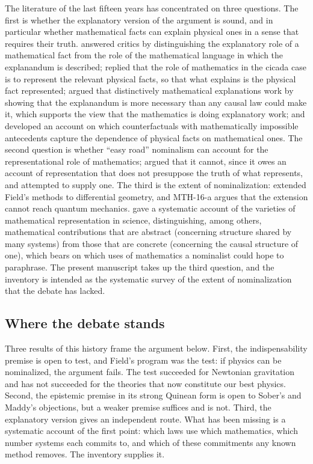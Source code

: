 \documentclass{situationist-preprint}
\begin{document}
The literature of the last fifteen years has concentrated on three questions. The first is whether the explanatory version of the argument is sound, and in particular whether mathematical facts can explain physical ones in a sense that requires their truth. \citet{Baker2009} answered critics by distinguishing the explanatory role of a mathematical fact from the role of the mathematical language in which the explanandum is described; \citet{Saatsi2011} replied that the role of mathematics in the cicada case is to represent the relevant physical facts, so that what explains is the physical fact represented; \citet{Lange2013} argued that distinctively mathematical explanations work by showing that the explanandum is more necessary than any causal law could make it, which supports the view that the mathematics is doing explanatory work; and \citet{Baron2017} developed an account on which counterfactuals with mathematically impossible antecedents capture the dependence of physical facts on mathematical ones. The second question is whether \enquote{easy road} nominalism can account for the representational role of mathematics; \citet{Colyvan2010} argued that it cannot, since it owes an account of representation that does not presuppose the truth of what represents, and \citet{Leng2010} attempted to supply one. The third is the extent of nominalization: \citet{ArntzeniusDorr2012} extended Field's methods to differential geometry, and MTH-16-a argues that the extension cannot reach quantum mechanics. \citet{Pincock2012} gave a systematic account of the varieties of mathematical representation in science, distinguishing, among others, mathematical contributions that are abstract (concerning structure shared by many systems) from those that are concrete (concerning the causal structure of one), which bears on which uses of mathematics a nominalist could hope to paraphrase. The present manuscript takes up the third question, and the inventory is intended as the systematic survey of the extent of nominalization that the debate has lacked.

\subsection{Where the debate stands}

Three results of this history frame the argument below. First, the indispensability premise is open to test, and Field's program was the test: if physics can be nominalized, the argument fails. The test succeeded for Newtonian gravitation and has not succeeded for the theories that now constitute our best physics. Second, the epistemic premise in its strong Quinean form is open to Sober's and Maddy's objections, but a weaker premise suffices and is not. Third, the explanatory version gives an independent route. What has been missing is a systematic account of the first point: which laws use which mathematics, which number systems each commits to, and which of these commitments any known method removes. The inventory supplies it.
\end{document}
